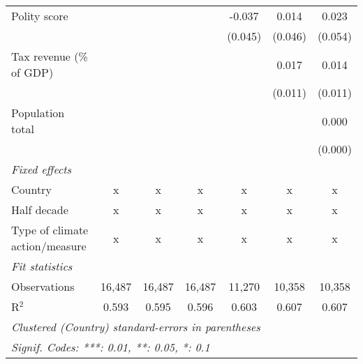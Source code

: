 \begin{tabular}{lcccccc}
   Polity score                                                           &         &                &                & -0.037         & 0.014          & 0.023\\   
                                                                          &         &                &                & (0.045)        & (0.046)        & (0.054)\\   
   Tax revenue (\% of GDP)                                                &         &                &                &                & 0.017          & 0.014\\   
                                                                          &         &                &                &                & (0.011)        & (0.011)\\   
   Population total                                                       &         &                &                &                &                & 0.000\\   
                                                                          &         &                &                &                &                & (0.000)\\   
   \emph{Fixed effects}\\
   Country                                                                & x       & x              & x              & x              & x              & x\\  
   Half decade                                                            & x       & x              & x              & x              & x              & x\\  
   Type of climate action/measure                                         & x       & x              & x              & x              & x              & x\\  
   \midrule \emph{Fit statistics}\\
   Observations                                                           & 16,487  & 16,487         & 16,487         & 11,270         & 10,358         & 10,358\\  
   R$^2$                                                                  & 0.593   & 0.595          & 0.596          & 0.603          & 0.607          & 0.607\\  
   \midrule
   \multicolumn{7}{l}{\emph{Clustered (Country) standard-errors in parentheses}}\\
   \multicolumn{7}{l}{\emph{Signif. Codes: ***: 0.01, **: 0.05, *: 0.1}}\\
\end{tabular}
\par\endgroup


